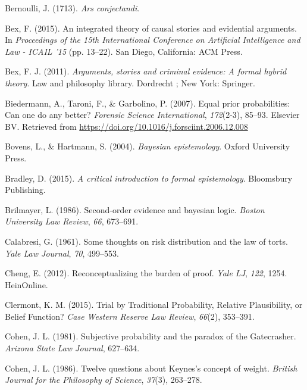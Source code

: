 \documentclass[11pt,dvipsnames,enabledeprecatedfontcommands]{scrartcl}
\begin{document}
\hypertarget{ref-Bernoulli1713Ars-conjectandi}{}
Bernoulli, J. (1713). \emph{Ars conjectandi}.

\hypertarget{ref-bex2015IntegratedTheoryCausal}{}
Bex, F. (2015). An integrated theory of causal stories and evidential
arguments. In \emph{Proceedings of the 15th International Conference on
Artificial Intelligence and Law - ICAIL '15} (pp. 13--22). San Diego,
California: ACM Press.

\hypertarget{ref-bex2011ArgumentsStoriesCriminal}{}
Bex, F. J. (2011). \emph{Arguments, stories and criminal evidence: A
formal hybrid theory}. Law and philosophy library. Dordrecht ; New York:
Springer.

\hypertarget{ref-Biedermann2007equal}{}
Biedermann, A., Taroni, F., \& Garbolino, P. (2007). Equal prior
probabilities: Can one do any better? \emph{Forensic Science
International}, \emph{172}(2-3), 85--93. Elsevier BV. Retrieved from
\url{https://doi.org/10.1016/j.forsciint.2006.12.008}

\hypertarget{ref-bovens2004bayesian}{}
Bovens, L., \& Hartmann, S. (2004). \emph{Bayesian epistemology}. Oxford
University Press.

\hypertarget{ref-bradley2015critical}{}
Bradley, D. (2015). \emph{A critical introduction to formal
epistemology}. Bloomsbury Publishing.

\hypertarget{ref-brilmayer1986}{}
Brilmayer, L. (1986). Second-order evidence and bayesian logic.
\emph{Boston University Law Review}, \emph{66}, 673--691.

\hypertarget{ref-Calabresi1961}{}
Calabresi, G. (1961). Some thoughts on risk distribution and the law of
torts. \emph{Yale Law Journal}, \emph{70}, 499--553.

\hypertarget{ref-cheng2012reconceptualizing}{}
Cheng, E. (2012). Reconceptualizing the burden of proof. \emph{Yale LJ},
\emph{122}, 1254. HeinOnline.

\hypertarget{ref-clermont2015TrialTraditionalProbability}{}
Clermont, K. M. (2015). Trial by Traditional Probability, Relative
Plausibility, or Belief Function? \emph{Case Western Reserve Law
Review}, \emph{66}(2), 353--391.

\hypertarget{ref-Cohen81}{}
Cohen, J. L. (1981). Subjective probability and the paradox of the
Gatecrasher. \emph{Arizona State Law Journal}, 627--634.

\hypertarget{ref-cohen86}{}
Cohen, J. L. (1986). Twelve questions about Keynes's concept of weight.
\emph{British Journal for the Philosophy of Science}, \emph{37}(3),
263--278.
\end{document}
